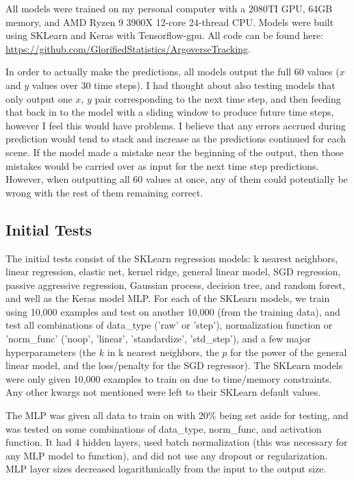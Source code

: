 \documentclass{article}
\begin{document}
All models were trained on my personal computer with a 2080TI GPU, 64GB memory, and AMD Ryzen 9 3900X 12-core 24-thread CPU. Models were built using SKLearn and Keras with Tensorflow-gpu. All code can be found here: \url{https://github.com/GlorifiedStatistics/ArgoverseTracking}.

In order to actually make the predictions, all models output the full 60 values ($x$ and $y$ values over 30 time steps). I had thought about also testing models that only output one $x$, $y$ pair corresponding to the next time step, and then feeding that back in to the model with a sliding window to produce future time steps, however I feel this would have problems. I believe that any errors accrued during prediction would tend to stack and increase as the predictions continued for each scene. If the model made a mistake near the beginning of the output, then those mistakes would be carried over as input for the next time step predictions. However, when outputting all 60 values at once, any of them could potentially be wrong with the rest of them remaining correct.

\subsection{Initial Tests}

The initial tests consist of the SKLearn regression models: k nearest neighbors, linear regression, elastic net, kernel ridge, general linear model, SGD regression, passive aggressive regression, Gaussian process, decision tree, and random forest, and well as the Keras model MLP. For each of the SKLearn models, we train using 10,000 examples and test on another 10,000 (from the training data), and test all combinations of data\_type ('raw' or 'step'), normalization function or 'norm\_func' ('noop', 'linear', 'standardize', 'std\_step'), and a few major hyperparameters (the $k$ in k nearest neighbors, the $p$ for the power of the general linear model, and the loss/penalty for the SGD regressor). The SKLearn models were only given 10,000 examples to train on due to time/memory constraints. Any other kwargs not mentioned were left to their SKLearn default values.

The MLP was given all data to train on with 20\% being set aside for testing, and was tested on some combinations of data\_type, norm\_func, and activation function. It had 4 hidden layers, used batch normalization (this was necessary for any MLP model to function), and did not use any dropout or regularization. MLP layer sizes decreased logarithmically from the input to the output size. 
\end{document}
